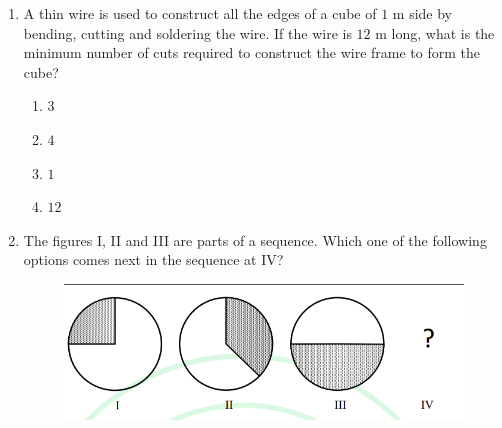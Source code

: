 \documentclass[journal,12pt,onecolumn]{IEEEtran}
\theoremstyle{remark}
\begin{document}
\begin{enumerate}
		\item A thin wire is used to construct all the edges of a cube of $1$ m side by bending, cutting and soldering the wire. If the wire is $12$ m long, what is the minimum number of cuts required to construct the wire frame to form the cube?
		
		\hfill{}
		
		\begin{multicols}{2}
			\begin{enumerate}
				\item $3$
				\item $4$
				\item $1$
				\item $12$
			\end{enumerate}
		\end{multicols}
		
		\item The figures I, II and III are parts of a sequence. Which one of the following options comes next in the sequence at IV?
		\begin{figure}[h]
			\centering
			\includegraphics[width=0.8\columnwidth]{q5.png}
			\caption*{}
			\label{fig:q5}
		\end{figure}
		
		\hfill{}
		

\end{enumerate}
\end{document}
